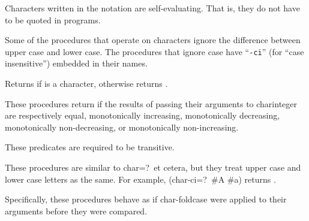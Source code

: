 Characters written in the \sharpsign\backwhack{} notation are self-evaluating.
That is, they do not have to be quoted in programs.

\vest Some of the procedures that operate on characters ignore the
difference between upper case and lower case.  The procedures that
ignore case have \hbox{``{\tt -ci}''} (for ``case
insensitive'') embedded in their names.


\begin{entry}{
}

Returns \schtrue{} if  is a character, otherwise returns \schfalse.

\end{entry}


\begin{entry}{
}

\label{characterequality}

These procedures return \schtrue{} if
the results of passing their arguments to {\cf char\coerce{}integer}
are respectively
equal, monotonically increasing, monotonically decreasing,
monotonically non-decreasing, or monotonically non-increasing.

These predicates are required to be transitive.

\end{entry}


\begin{entry}{
}

These procedures are similar to {\cf char=?}\ et cetera, but they treat
upper case and lower case letters as the same.  For example, {\cf
(char-ci=?\ \#\backwhack{}A \#\backwhack{}a)} returns \schtrue.

Specifically, these procedures behave as if {\cf char-foldcase} were
applied to their arguments before they were compared.

\end{entry}


